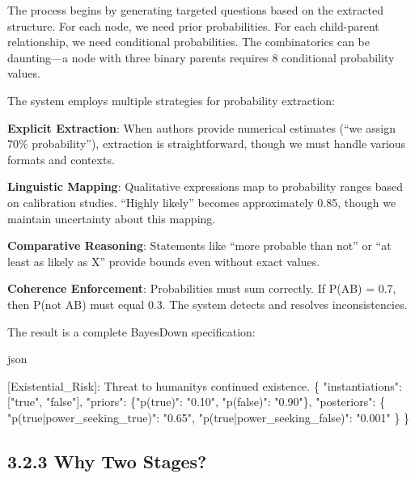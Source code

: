 \documentclass[
  11pt,
  letterpaper,
]{book}
\newenvironment{Shaded}{\begin{snugshade}}{\end{snugshade}}
\newcommand{\DataTypeTok}[1]{\textcolor[rgb]{0.68,0.00,0.00}{#1}}
\newcommand{\ErrorTok}[1]{\textcolor[rgb]{0.68,0.00,0.00}{#1}}
\newcommand{\FunctionTok}[1]{\textcolor[rgb]{0.28,0.35,0.67}{#1}}
\newcommand{\OtherTok}[1]{\textcolor[rgb]{0.00,0.23,0.31}{#1}}
\newcommand{\StringTok}[1]{\textcolor[rgb]{0.13,0.47,0.30}{#1}}
\begin{document}
The process begins by generating targeted questions based on the
extracted structure. For each node, we need prior probabilities. For
each child-parent relationship, we need conditional probabilities. The
combinatorics can be daunting---a node with three binary parents
requires 8 conditional probability values.

The system employs multiple strategies for probability extraction:

\textbf{Explicit Extraction}: When authors provide numerical estimates
(``we assign 70\% probability''), extraction is straightforward, though
we must handle various formats and contexts.

\textbf{Linguistic Mapping}: Qualitative expressions map to probability
ranges based on calibration studies. ``Highly likely'' becomes
approximately 0.85, though we maintain uncertainty about this mapping.

\textbf{Comparative Reasoning}: Statements like ``more probable than
not'' or ``at least as likely as X'' provide bounds even without exact
values.

\textbf{Coherence Enforcement}: Probabilities must sum correctly. If
P(A\textbar B) = 0.7, then P(not A\textbar B) must equal 0.3. The system
detects and resolves inconsistencies.

The result is a complete BayesDown specification:

json

\begin{Shaded}
\begin{Highlighting}[]
\OtherTok{[}\ErrorTok{Existential\_Risk}\OtherTok{]}\ErrorTok{:} \ErrorTok{Threat} \ErrorTok{to} \ErrorTok{humanity\textquotesingle{}s} \ErrorTok{continued} \ErrorTok{existence.} \FunctionTok{\{}
  \DataTypeTok{"instantiations"}\FunctionTok{:} \OtherTok{[}\StringTok{"true"}\OtherTok{,} \StringTok{"false"}\OtherTok{]}\FunctionTok{,}
  \DataTypeTok{"priors"}\FunctionTok{:} \FunctionTok{\{}\DataTypeTok{"p(true)"}\FunctionTok{:} \StringTok{"0.10"}\FunctionTok{,} \DataTypeTok{"p(false)"}\FunctionTok{:} \StringTok{"0.90"}\FunctionTok{\},}
  \DataTypeTok{"posteriors"}\FunctionTok{:} \FunctionTok{\{}
    \DataTypeTok{"p(true|power\_seeking\_true)"}\FunctionTok{:} \StringTok{"0.65"}\FunctionTok{,}
    \DataTypeTok{"p(true|power\_seeking\_false)"}\FunctionTok{:} \StringTok{"0.001"}
  \FunctionTok{\}}
\FunctionTok{\}}
\end{Highlighting}
\end{Shaded}

\subsection{3.2.3 Why Two Stages?}\label{sec-why-two-stages}
\end{document}
